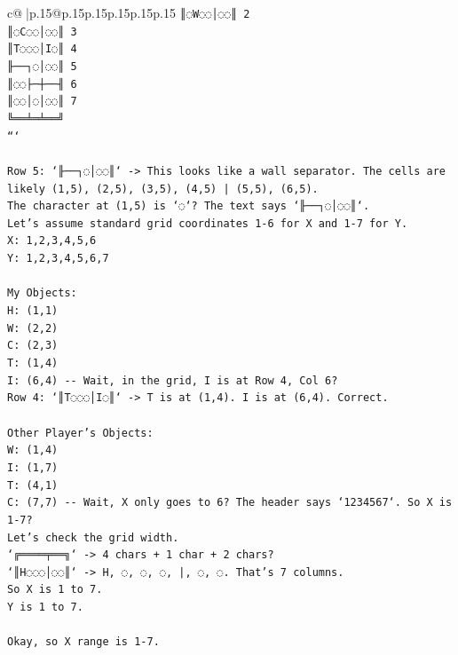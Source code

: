 \documentclass{article}
\begin{document}
{\begin{supertabular}{c@{$\;$}|p{.15\linewidth}@{}p{.15\linewidth}p{.15\linewidth}p{.15\linewidth}p{.15\linewidth}p{.15\linewidth}}
{{{\texttt{║◌W◌◌│◌◌║ 2} \\
\texttt{║◌C◌◌│◌◌║ 3} \\
\texttt{║T◌◌◌│I◌║ 4} \\
\texttt{╟──┐◌│◌◌║ 5} \\
\texttt{║◌◌├─┼──╢ 6} \\
\texttt{║◌◌│◌│◌◌║ 7} \\
\texttt{╚══╧═╧══╝} \\
\texttt{```} \\
\\ 
\texttt{Row 5: `╟──┐◌│◌◌║` {-}> This looks like a wall separator. The cells are likely (1,5), (2,5), (3,5), (4,5) | (5,5), (6,5).} \\
\texttt{The character at (1,5) is `◌`? The text says `╟──┐◌│◌◌║`.} \\
\texttt{Let's assume standard grid coordinates 1{-}6 for X and 1{-}7 for Y.} \\
\texttt{X: 1,2,3,4,5,6} \\
\texttt{Y: 1,2,3,4,5,6,7} \\
\\ 
\texttt{My Objects:} \\
\texttt{H: (1,1)} \\
\texttt{W: (2,2)} \\
\texttt{C: (2,3)} \\
\texttt{T: (1,4)} \\
\texttt{I: (6,4) {-}{-} Wait, in the grid, I is at Row 4, Col 6?} \\
\texttt{Row 4: `║T◌◌◌│I◌║` {-}> T is at (1,4). I is at (6,4). Correct.} \\
\\ 
\texttt{Other Player's Objects:} \\
\texttt{W: (1,4)} \\
\texttt{I: (1,7)} \\
\texttt{T: (4,1)} \\
\texttt{C: (7,7) {-}{-} Wait, X only goes to 6? The header says `1234567`. So X is 1{-}7?} \\
\texttt{Let's check the grid width.} \\
\texttt{`╔════╤══╗` {-}> 4 chars + 1 char + 2 chars?} \\
\texttt{`║H◌◌◌│◌◌║` {-}> H, ◌, ◌, ◌, |, ◌, ◌. That's 7 columns.} \\
\texttt{So X is 1 to 7.} \\
\texttt{Y is 1 to 7.} \\
\\ 
\texttt{Okay, so X range is 1{-}7.} \\
}}}
\end{supertabular}}
\end{document}
